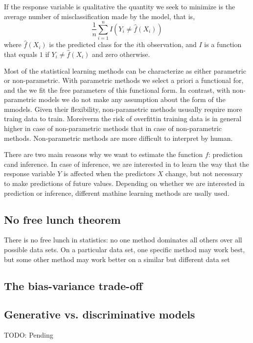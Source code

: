 If the response variable is qualitative the quantity we seek to minimize is the average number of misclassification made by the model, that is,
\[
\frac{1}{n} \sum_{i=1}^n I \left( Y_i \neq \hat{f}(X_i) \right)
\]
where $\hat{f}(X_i)$ is the predicted class for the $i$th observation, and $I$ is a function that equals $1$ if $Y_i \neq \hat{f}(X_i)$ and zero otherwise.

Most of the statistical learning methods can be characterize as either parametric or non-parametric. With parametric methods we select a priori a functional for, and the we fit the free parameters of this functional form. In contrast, with non-parametric models we do not make any assumption about the form of the mmodels. Given their flexibility, non-parametric methods ususally require more traing data to train. Moreiverm the risk of overfittin training data is in general higher in case of non-parametric methods that in case of non-parametric methods. Non-parametric methods are more difficult to interpret by human.

There are two main reasons why we want to estimate the function $f$: prediction cand inference. In case of inference, we are interested in to learn the way that the response variable $Y$ is affected when the predictors $X$ change, but not necessary to make predictions of future values. Depending on whether we are interested in prediction or inference, different mathine learning methods are usally used.

\subsection{No free lunch theorem}

{\color{red} There is no free lunch in statistics: no one method dominates all others over all possible data sets. On a particular data set, one specific method may work best, but some other method may work better on a similar but different data set}

\subsection{The bias-variance trade-off}

\subsection{Generative vs. discriminative models}

{\color{red} TODO: Pending}

